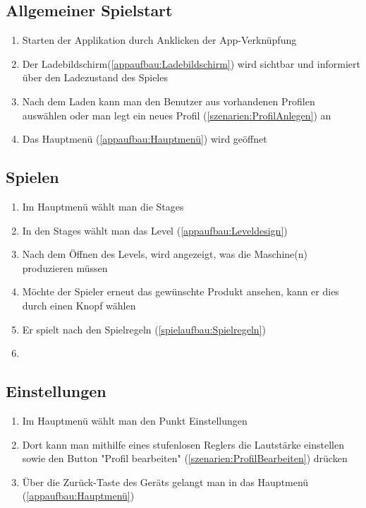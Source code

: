 \documentclass{scrartcl}
\begin{document}
\subsection{Allgemeiner Spielstart}
	\begin{enumerate}
		\item Starten der Applikation durch Anklicken der App-Verknüpfung
		\item Der Ladebildschirm(\ref{appaufbau:Ladebildschirm}) wird sichtbar und informiert über den Ladezustand des Spieles
		\item Nach dem Laden kann man den Benutzer aus vorhandenen Profilen auswählen oder man legt ein neues Profil (\ref{szenarien:ProfilAnlegen}) an
		\item Das Hauptmenü (\ref{appaufbau:Hauptmenü}) wird geöffnet		
	\end{enumerate}
	
\subsection{Spielen} 
	\begin{enumerate}
		\item Im Hauptmenü wählt man die Stages
		\item In den Stages wählt man das Level (\ref{appaufbau:Leveldesign})
		\item Nach dem Öffnen des Levels, wird angezeigt, was die Maschine(n) produzieren müssen
		\item Möchte der Spieler erneut das gewünschte Produkt ansehen, kann er dies durch einen Knopf wählen
		\item Er spielt nach den Spielregeln (\ref{spielaufbau:Spielregeln})
		\item 
	\end{enumerate}
	
\subsection{Einstellungen}
	\begin{enumerate}
		\item Im Hauptmenü wählt man den Punkt \glqq Einstellungen\grqq
		\item Dort kann man mithilfe eines stufenlosen Reglers die Lautstärke einstellen sowie den Button "Profil bearbeiten" (\ref{szenarien:ProfilBearbeiten}) drücken
		\item Über die \glqq Zurück\grqq-Taste des Geräts gelangt man in das Hauptmenü (\ref{appaufbau:Hauptmenü})
	\end{enumerate}
\end{document}
